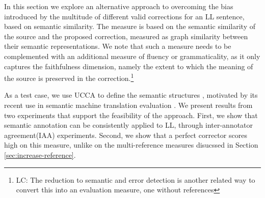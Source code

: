 \documentclass[letter,11pt]{article}
\newcommand{\lc}[1]{\footnote{\color{green}LC: #1}}
\begin{document}


In this section we explore an alternative approach to overcoming the bias
introduced by the multitude of different valid corrections for an LL sentence, based
on semantic similarity.
The measure is based on the semantic similarity of the source and the proposed correction,
measured as graph similarity between their semantic representations.
We note that such a measure needs to be complemented with an additional
measure of fluency or grammaticality\cite{sakaguchi2016reassessing}, as it only captures
the faithfulness dimension, namely the extent to which
the meaning of the source is preserved in the correction.\lc{The reduction to semantic and error detection is another related way to convert this into an evaluation measure, one without references}

As a test case, we use UCCA to define the semantic structures \cite{abend2013universal}, motivated by
its recent use in semantic machine translation evaluation \cite{birch2016hume}.
We present results from two experiments that support the feasibility of the approach.
First, we show that semantic annotation can be consistently applied to LL,
through inter-annotator agreement(IAA) experiments.
Second, we show that a perfect corrector scores high on this measure, unlike on
the multi-reference measures disucssed in Section \ref{sec:increase-reference}.


\end{document}
